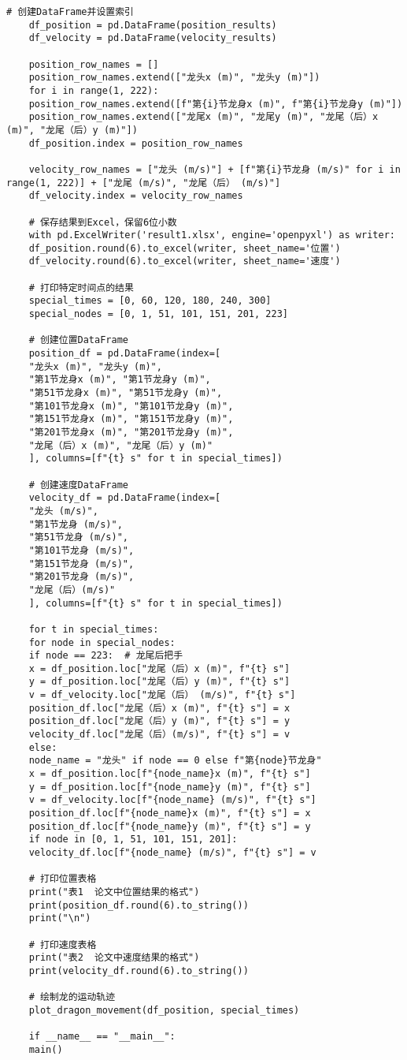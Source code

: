 \begin{lstlisting}[caption={问题一处理代码1}]
	# 创建DataFrame并设置索引
	df_position = pd.DataFrame(position_results)
	df_velocity = pd.DataFrame(velocity_results)
	
	position_row_names = []
	position_row_names.extend(["龙头x (m)", "龙头y (m)"])
	for i in range(1, 222):
	position_row_names.extend([f"第{i}节龙身x (m)", f"第{i}节龙身y (m)"])
	position_row_names.extend(["龙尾x (m)", "龙尾y (m)", "龙尾（后）x (m)", "龙尾（后）y (m)"])
	df_position.index = position_row_names
	
	velocity_row_names = ["龙头 (m/s)"] + [f"第{i}节龙身 (m/s)" for i in range(1, 222)] + ["龙尾 (m/s)", "龙尾（后） (m/s)"]
	df_velocity.index = velocity_row_names
	
	# 保存结果到Excel，保留6位小数
	with pd.ExcelWriter('result1.xlsx', engine='openpyxl') as writer:
	df_position.round(6).to_excel(writer, sheet_name='位置')
	df_velocity.round(6).to_excel(writer, sheet_name='速度')
	
	# 打印特定时间点的结果
	special_times = [0, 60, 120, 180, 240, 300]
	special_nodes = [0, 1, 51, 101, 151, 201, 223]
	
	# 创建位置DataFrame
	position_df = pd.DataFrame(index=[
	"龙头x (m)", "龙头y (m)",
	"第1节龙身x (m)", "第1节龙身y (m)",
	"第51节龙身x (m)", "第51节龙身y (m)",
	"第101节龙身x (m)", "第101节龙身y (m)",
	"第151节龙身x (m)", "第151节龙身y (m)",
	"第201节龙身x (m)", "第201节龙身y (m)",
	"龙尾（后）x (m)", "龙尾（后）y (m)"
	], columns=[f"{t} s" for t in special_times])
	
	# 创建速度DataFrame
	velocity_df = pd.DataFrame(index=[
	"龙头 (m/s)",
	"第1节龙身 (m/s)",
	"第51节龙身 (m/s)",
	"第101节龙身 (m/s)",
	"第151节龙身 (m/s)",
	"第201节龙身 (m/s)",
	"龙尾（后）(m/s)"
	], columns=[f"{t} s" for t in special_times])
	
	for t in special_times:
	for node in special_nodes:
	if node == 223:  # 龙尾后把手
	x = df_position.loc["龙尾（后）x (m)", f"{t} s"]
	y = df_position.loc["龙尾（后）y (m)", f"{t} s"]
	v = df_velocity.loc["龙尾（后） (m/s)", f"{t} s"]
	position_df.loc["龙尾（后）x (m)", f"{t} s"] = x
	position_df.loc["龙尾（后）y (m)", f"{t} s"] = y
	velocity_df.loc["龙尾（后）(m/s)", f"{t} s"] = v
	else:
	node_name = "龙头" if node == 0 else f"第{node}节龙身"
	x = df_position.loc[f"{node_name}x (m)", f"{t} s"]
	y = df_position.loc[f"{node_name}y (m)", f"{t} s"]
	v = df_velocity.loc[f"{node_name} (m/s)", f"{t} s"]
	position_df.loc[f"{node_name}x (m)", f"{t} s"] = x
	position_df.loc[f"{node_name}y (m)", f"{t} s"] = y
	if node in [0, 1, 51, 101, 151, 201]:
	velocity_df.loc[f"{node_name} (m/s)", f"{t} s"] = v
	
	# 打印位置表格
	print("表1  论文中位置结果的格式")
	print(position_df.round(6).to_string())
	print("\n")
	
	# 打印速度表格
	print("表2  论文中速度结果的格式")
	print(velocity_df.round(6).to_string())
	
	# 绘制龙的运动轨迹
	plot_dragon_movement(df_position, special_times)
	
	if __name__ == "__main__":
	main()
		
\end{lstlisting}





